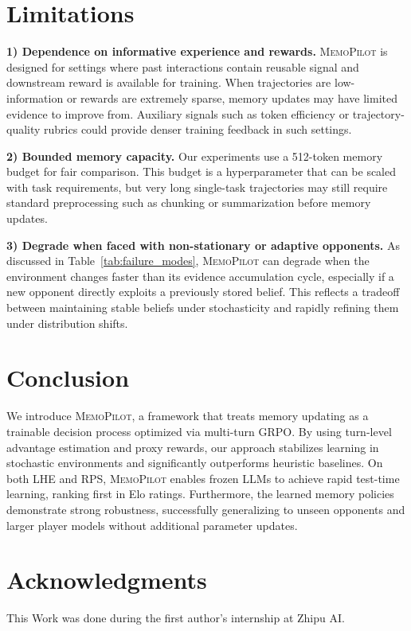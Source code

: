 \documentclass{article}
\newcommand{\methodname}{MemoPilot}
\newcommand{\method}{\textsc{\methodname}}
\theoremstyle{plain}
\theoremstyle{definition}
\theoremstyle{remark}
\begin{document}
\section{Limitations}
\label{sec:limitations}

\textbf{1) Dependence on informative experience and rewards.}
\method{} is designed for settings where past interactions contain reusable signal and downstream reward is available for training. When trajectories are low-information or rewards are extremely sparse, memory updates may have limited evidence to improve from. Auxiliary signals such as token efficiency or trajectory-quality rubrics could provide denser training feedback in such settings.

\textbf{2) Bounded memory capacity.}
Our experiments use a 512-token memory budget for fair comparison. This budget is a hyperparameter that can be scaled with task requirements, but very long single-task trajectories may still require standard preprocessing such as chunking or summarization before memory updates.

\textbf{3) Degrade when faced with non-stationary or adaptive opponents.}
As discussed in Table~\ref{tab:failure_modes}, \method{} can degrade when the environment changes faster than its evidence accumulation cycle, especially if a new opponent directly exploits a previously stored belief. This reflects a tradeoff between maintaining stable beliefs under stochasticity and rapidly refining them under distribution shifts.

\section{Conclusion}
\label{sec:conclusion}

We introduce \method{}, a framework that treats memory updating as a trainable decision process optimized via multi-turn GRPO. By using turn-level advantage estimation and proxy rewards, our approach stabilizes learning in stochastic environments and significantly outperforms heuristic baselines. On both LHE and RPS, \method{} enables frozen LLMs to achieve rapid test-time learning, ranking first in Elo ratings. Furthermore, the learned memory policies demonstrate strong robustness, successfully generalizing to unseen opponents and larger player models without additional parameter updates.

\section*{Acknowledgments}
This Work was done during the first author's internship at Zhipu AI.
\end{document}
